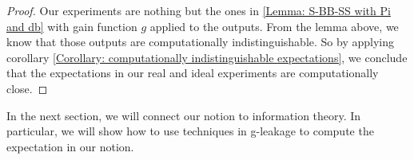 \begin{proof}
	Our experiments are nothing but the ones in \ref{Lemma: S-BB-SS with Pi and db} with gain function $g$ applied to the outputs. From the lemma above, we know that those outputs are computationally indistinguishable. So by applying corollary \ref{Corollary: computationally indistinguishable expectations}, we conclude that the expectations in our real and ideal experiments are computationally close.
\end{proof}

In the next section, we will connect our notion to information theory. In particular, we will show how to use techniques in g-leakage to compute the expectation in our notion.

